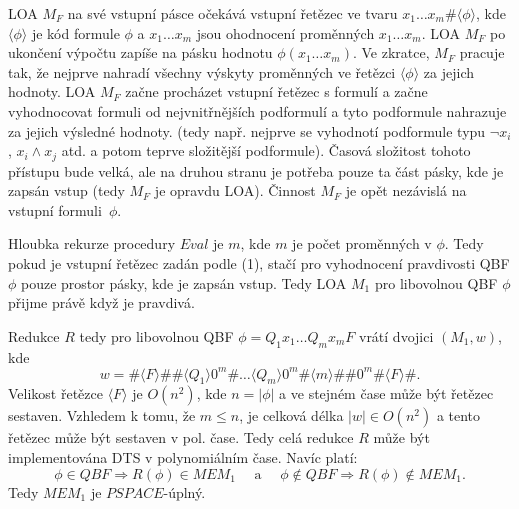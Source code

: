 \documentclass[a4paper,12pt]{article}
\begin{document}
\begin{enumerate}[label=\textbf{\arabic*}.]
  LOA $M_F$ na své vstupní pásce očekává vstupní řetězec ve tvaru $x_1\dots x_m\#\langle\phi\rangle$, kde
  $\langle\phi\rangle$ je kód formule $\phi$ a $x_1\dots x_m$ jsou ohodnocení proměnných $x_1\dots x_m$.
  LOA $M_F$ po ukončení výpočtu zapíše na pásku hodnotu $\phi(x_1\dots x_m)$. Ve zkratce, $M_F$ pracuje tak,
  že nejprve nahradí všechny výskyty proměnných ve řetězci $\langle\phi\rangle$ za jejich hodnoty. LOA $M_F$
  začne procházet vstupní řetězec s formulí a začne vyhodnocovat formuli od nejvnitřnějších podformulí a tyto 
  podformule nahrazuje za jejich výsledné hodnoty. (tedy např. nejprve se vyhodnotí podformule typu $\neg x_i$, 
  $x_i \wedge x_j$ atd. a potom teprve složitější podformule).
  Časová složitost tohoto přístupu bude velká, ale na druhou stranu je potřeba pouze ta část pásky, kde
  je zapsán vstup (tedy $M_F$ je opravdu LOA). Činnost $M_F$ je opět nezávislá na vstupní formuli~$\phi$.
  
  Hloubka rekurze procedury $Eval$ je $m$, kde $m$ je počet proměnných v $\phi$. Tedy pokud je vstupní řetězec
  zadán podle (1), stačí pro vyhodnocení pravdivosti QBF $\phi$ pouze prostor pásky, kde je zapsán vstup.
  Tedy LOA $M_1$ pro libovolnou QBF $\phi$ přijme právě když je pravdivá.
  
  Redukce $R$ tedy pro libovolnou QBF $\phi = Q_1x_1\dots Q_mx_m F$ vrátí dvojici $(M_1, w)$, kde 
  $$
    w = \#\langle F\rangle\#\#\langle Q_1\rangle 0^m\#\dots \langle Q_m\rangle 0^m\#\langle m\rangle\#\#0^m\#\langle F\rangle\#.
  $$
  Velikost řetězce $\langle F\rangle$ je $O(n^2)$, kde $n=|\phi|$ a ve stejném čase může být řetězec sestaven.
  Vzhledem k tomu, že $m\leq n$, je celková délka $|w| \in O(n^2)$ a tento řetězec může být sestaven v pol. čase.
  Tedy celá redukce $R$ může být implementována DTS v polynomiálním čase.
  Navíc platí:
  $$
    \phi \in QBF \Rightarrow R(\phi) \in MEM_1\quad \mbox{ a }\quad\phi \not\in QBF \Rightarrow R(\phi) \not\in MEM_1.
  $$
  Tedy $MEM_1$ je $PSPACE$-úplný.
  

\end{enumerate}
\end{document}
